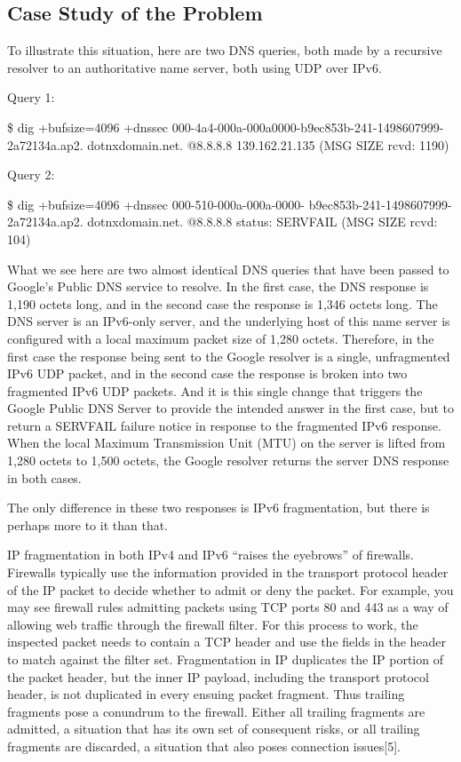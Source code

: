 \subsection{Case Study of the Problem}


To illustrate this situation, here are two DNS queries, 
both made by a recursive resolver to an authoritative 
name server, both using UDP over IPv6.

Query 1:

\$ dig +bufsize=4096 +dnssec 000-4a4-000a-000a0000-b9ec853b-241-1498607999-2a72134a.ap2.
dotnxdomain.net. @8.8.8.8
139.162.21.135
(MSG SIZE rcvd: 1190)

Query 2:

\$ dig +bufsize=4096 +dnssec 000-510-000a-000a-0000-
b9ec853b-241-1498607999-2a72134a.ap2.
dotnxdomain.net. @8.8.8.8
status: SERVFAIL
(MSG SIZE rcvd: 104)

What we see here are two almost identical DNS queries that have
been passed to Google’s Public DNS service to resolve.
In the first case, the DNS response is 1,190 octets long, and in the
second case the response is 1,346 octets long. The DNS server is an
IPv6-only server, and the underlying host of this name server is configured
with a local maximum packet size of 1,280 octets. Therefore,
in the first case the response being sent to the Google resolver is a
single, unfragmented IPv6 UDP packet, and in the second case the
response is broken into two fragmented IPv6 UDP packets. And it is
this single change that triggers the Google Public DNS Server to provide
the intended answer in the first case, but to return a SERVFAIL
failure notice in response to the fragmented IPv6 response. When the
local Maximum Transmission Unit (MTU) on the server is lifted from
1,280 octets to 1,500 octets, the Google resolver returns the server
DNS response in both cases. 

The only difference in these two responses is IPv6 fragmentation, but
there is perhaps more to it than that.

IP fragmentation in both IPv4 and IPv6 “raises the eyebrows” of
firewalls. Firewalls typically use the information provided in the
transport protocol header of the IP packet to decide whether to admit
or deny the packet. For example, you may see firewall rules admitting
packets using TCP ports 80 and 443 as a way of allowing web traffic
through the firewall filter. For this process to work, the inspected
packet needs to contain a TCP header and use the fields in the header
to match against the filter set. Fragmentation in IP duplicates the IP
portion of the packet header, but the inner IP payload, including the
transport protocol header, is not duplicated in every ensuing packet
fragment. Thus trailing fragments pose a conundrum to the firewall.
Either all trailing fragments are admitted, a situation that has its own
set of consequent risks, or all trailing fragments are discarded, a situation
that also poses connection issues[5].

